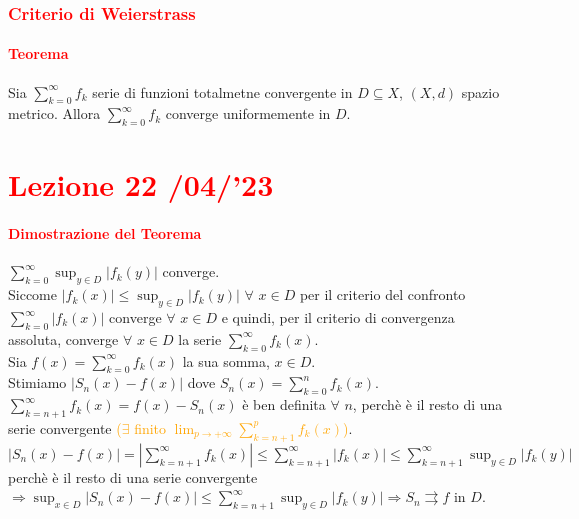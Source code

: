 \documentclass{article}
\begin{document}
\subsubsection{\textcolor{red}{Criterio di Weierstrass}}
\paragraph{\textcolor{red}{Teorema}}
Sia $\sum_{k=0}^{\infty}f_k$ serie di funzioni totalmetne convergente in $ D \subseteq X$, $ (X,d)$ spazio metrico. Allora $\sum_{k=0}^{\infty}f_k$ converge uniformemente in $D$.

\newpage
\section{\textcolor{red}{Lezione 22 \space{}/04/'23}}
\paragraph{\textcolor{red}{Dimostrazione del Teorema}}
$\sum_{k=0}^{\infty}\sup_{y \in D} |f_k(y)|$ converge.\\
Siccome $|f_k(x)|\leq \sup_{y \in D}|f_k(y)|\,\, \forall\,\, x \in D$ per il criterio del confronto $\sum_{k=0}^{\infty}|f_k(x)|$ converge $\forall \,\, x \in D$ e quindi, per il criterio di convergenza assoluta, converge $\forall\,\, x \in D$ la serie $\sum_{k=0}^{\infty} f_k(x)$.\\ 
Sia $f(x)=\sum_{k=0}^{\infty}f_k(x)$ la sua somma, $x \in D$.\\
Stimiamo $|S_n(x)-f(x)|$ dove $S_n(x)=\sum_{k=0}^{n}f_k(x)$.\\ $\sum_{k=n+1}^{\infty}f_k(x)=f(x)-S_n(x)$ è ben definita $\forall \,\, n$, perchè è il resto di una serie convergente
\textcolor{orange}{($\exists$ finito $\lim_{p \rightarrow+\infty}\sum_{k=n+1}^{p}f_k(x)$)}.\\ 
$|S_n(x)-f(x)|=|\sum_{k=n+1}^{\infty}f_k(x)|\leq \sum_{k=n+1}^{\infty}|f_k(x)| \leq \sum_{k=n+1}^{\infty} \sup_{y \in D}|f_k(y)|$ perchè è il resto di una serie convergente $\Rightarrow \sup_{x \in D}|S_n(x)-f(x)|\leq \sum_{k=n+1}^{\infty}\sup_{y \in D} |f_k(y)| \Rightarrow S_n \rightrightarrows f$ in $D$.
\begin{flushright}
\large\Lightning
\end{flushright}
\end{document}
